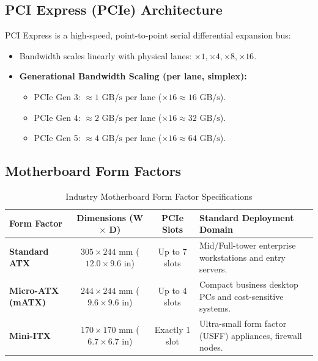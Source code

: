 \subsection{PCI Express (PCIe) Architecture}
PCI Express is a high-speed, point-to-point serial differential expansion bus:
\begin{itemize}
    \item Bandwidth scales linearly with physical lanes: $\times 1, \times 4, \times 8, \times 16$.
    \item \textbf{Generational Bandwidth Scaling (per lane, simplex):}
    \begin{itemize}
        \item PCIe Gen 3: $\approx 1\text{ GB/s}$ per lane ($\times 16 \approx 16\text{ GB/s}$).
        \item PCIe Gen 4: $\approx 2\text{ GB/s}$ per lane ($\times 16 \approx 32\text{ GB/s}$).
        \item PCIe Gen 5: $\approx 4\text{ GB/s}$ per lane ($\times 16 \approx 64\text{ GB/s}$).
    \end{itemize}
\end{itemize}

\subsection{Motherboard Form Factors}
\begin{table}[htbp]
\centering
\small
\caption{Industry Motherboard Form Factor Specifications}
\label{tab:motherboard_form_factors}
\begin{tabularx}{\textwidth}{l c c X}
\toprule
\textbf{Form Factor} & \textbf{Dimensions (W $\times$ D)} & \textbf{PCIe Slots} & \textbf{Standard Deployment Domain} \\
\midrule
\textbf{Standard ATX} & $305 \times 244\text{ mm}$ ($12.0 \times 9.6\text{ in}$) & Up to 7 slots & Mid/Full-tower enterprise workstations and entry servers. \\
\textbf{Micro-ATX (mATX)} & $244 \times 244\text{ mm}$ ($9.6 \times 9.6\text{ in}$) & Up to 4 slots & Compact business desktop PCs and cost-sensitive systems. \\
\textbf{Mini-ITX} & $170 \times 170\text{ mm}$ ($6.7 \times 6.7\text{ in}$) & Exactly 1 slot & Ultra-small form factor (USFF) appliances, firewall nodes. \\
\bottomrule
\end{tabularx}
\end{table}


